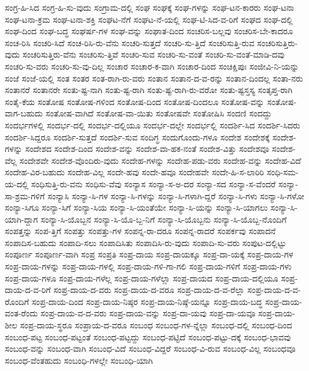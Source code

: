 {ಸಂಗ್ರ-ಹಿ-ಸಿದ
ಸಂಗ್ರ-ಹಿ-ಸು-ವುದು
ಸಂಗ್ರಾಮ-ದಲ್ಲಿ
ಸಂಘ
ಸಂಘಕ್ಕೆ
ಸಂಘ-ಗಳನ್ನು
ಸಂಘ-ಟನ-ಕಾರರು
ಸಂಘ-ಟನಾ
ಸಂಘ-ಟನಾ-ಕ್ರಮ
ಸಂಘ-ಟನಾ-ಶಕ್ತಿ
ಸಂಘಟ-ನೆಗೆ
ಸಂಘಟ-ನೆ-ಯಲ್ಲಿ
ಸಂಘ-ಟಿ-ಸಿದ-ವ-ರಿಗೆ
ಸಂಘದ
ಸಂಘ-ದಲ್ಲಿ
ಸಂಘ-ದಿಂದ
ಸಂಘ-ಬದ್ಧ
ಸಂಘರ್ಷ-ಗಳ
ಸಂಘ-ವನ್ನು
ಸಂಘಾತ-ದಿಂದ
ಸಂಚರಿಸ-ಬಲ್ಲವು
ಸಂಚರಿಸ-ಬೇ-ಕಾದರೂ
ಸಂಚ-ರಿಸಿ
ಸಂಚರಿ-ಸಿದೆ
ಸಂಚ-ರಿಸಿ-ರು-ವೆನು
ಸಂಚರಿ-ಸುತ್ತದೆ
ಸಂಚರಿ-ಸು-ತ್ತಿದೆ
ಸಂಚರಿಸುತ್ತಿ-ರುವ
ಸಂಚರಿಸುತ್ತಿರು-ವುದು
ಸಂಚರಿಸುತ್ತಿರು-ವೆನು
ಸಂಚರಿಸು-ತ್ತಿವೆ
ಸಂಚರಿ-ಸುವ
ಸಂಚರಿ-ಸು-ವಂತೆ
ಸಂಚರಿ-ಸು-ವಂತೆ-ಮಾಡಿ-ದವು
ಸಂಚರಿ-ಸು-ವರು
ಸಂಚರಿ-ಸು-ವು-ದಿಲ್ಲ
ಸಂಚಾರ
ಸಂಚಾರ-ಕ-ವಾಗಿ
ಸಂಚಾರ-ದಿಂದ
ಸಂಚಿಕ್ಷಿಪುಃ
ಸಂಜೀವಿ-ನಿ-ಯನ್ನು
ಸಂಜೆ
ಸಂಜೆ-ಯಲ್ಲಿ
ಸಂತ
ಸಂತರ
ಸಂತ-ರಾಗಿ-ರು-ವರು
ಸಂತಾನ
ಸಂತಾನ-ದ-ವ-ರನ್ನು
ಸಂತಾನ-ದಿಂದಲ್ಲ
ಸಂತಾ-ನರು
ಸಂತಾನರೆ
ಸಂತಾನರೇ
ಸಂತು-ಷ್ಟ-ನಾಗಿ
ಸಂತು-ಷ್ಟ-ರಾಗಿ
ಸಂತು-ಷ್ಟ-ರಾಗಿ-ರು-ವರೋ
ಸಂತು-ಷ್ಟಸ್ತಸ್ಯ
ಸಂತೃಪ್ತ-ರಾಗಿ
ಸಂತೈ-ಕೆಯ
ಸಂತೋಷ
ಸಂತೋಷ-ಗಳಿಂದ
ಸಂತೋಷ-ದಿಂದ
ಸಂತೋಷ-ದಿಂದಲೂ
ಸಂತೋಷ-ವನ್ನು
ಸಂತೋಷ-ವಾಗ-ಬಹುದು
ಸಂತೋಷ-ವಾಗಿದೆ
ಸಂತೋಷ-ವಾ-ಯಿತು
ಸಂತೋಷವೇ
ಸಂತೋಷಿಸಿ
ಸಂದಣಿ
ಸಂದದ್ದು
ಸಂದರ್ಭಗಳಲ್ಲಿ
ಸಂದರ್ಭ-ದಲ್ಲಿ
ಸಂದರ್ಭ-ದಲ್ಲಿಯೂ
ಸಂದರ್ಭ-ದಲ್ಲೇ
ಸಂದರ್ಭಲ್ಲಿ
ಸಂದರ್ಶಿ-ಸಿದ
ಸಂದರ್ಶಿ-ಸಿದರು
ಸಂದರ್ಶಿ-ಸಿದ್ದರೂ
ಸಂದರ್ಶಿ-ಸುತ್ತದೆ
ಸಂದರ್ಶಿ-ಸುವ
ಸಂದಿಗ್ಧ
ಸಂದುಗೊಂದು-ಗಳೂ
ಸಂದೇಶ
ಸಂದೇಶಕ್ಕೆ
ಸಂದೇಶ-ಗಳನ್ನು
ಸಂದೇಶದ
ಸಂದೇಶ-ದಿಂದ
ಸಂದೇಶ-ವನ್ನು
ಸಂದೇಶ-ವಾ-ಹಕ-ನಂತೆ
ಸಂದೇಶ-ವಿತ್ತು
ಸಂದೇಶವೂ
ಸಂದೇಶ-ವೆಲ್ಲ
ಸಂದೇಶವೇ
ಸಂದೇಶ-ವೊಂದಿರು-ವುದು
ಸಂದೇಹ-ಗಳನ್ನು
ಸಂದೇಹ-ಪಡು-ವರು
ಸಂದೇಹ-ವನ್ನು
ಸಂದೇಹ-ವಿದೆ
ಸಂದೇಹ-ವಿರ-ಬಹುದು
ಸಂದೇಹ-ವಿಲ್ಲ
ಸಂದೇ-ಹವು
ಸಂದೇ-ಹವೂ
ಸಂದೇಹವೇ
ಸಂದೇ-ಹಿ-ಸ-ಲಾರಿರಿ
ಸಂಧಿ-ಸಮ-ಯ-ದಲ್ಲಿ
ಸಂಧಿಸುತ್ತಿ-ರು-ವನು
ಸಂಧಿಸು-ವೆವು
ಸಂನ್ಯಾಸ
ಸಂನ್ಯಾ-ಸ-ಅ-ದರ
ಸಂನ್ಯಾ-ಸದ
ಸಂನ್ಯಾ-ಸ-ವೆಂದರೆ
ಸಂನ್ಯಾ-ಸಾ-ಶ್ರಮ-ಗಳಿಗೆ
ಸಂನ್ಯಾಸಿ
ಸಂನ್ಯಾ-ಸಿ-ಗಳ
ಸಂನ್ಯಾ-ಸಿ-ಗಳನ್ನು
ಸಂನ್ಯಾ-ಸಿ-ಗಳಾಗಿ-ದ್ದರೆ
ಸಂನ್ಯಾ-ಸಿ-ಗಳು
ಸಂನ್ಯಾ-ಸಿ-ಗಳೋ
ಸಂನ್ಯಾ-ಸಿಗೂ
ಸಂನ್ಯಾ-ಸಿಗೆ
ಸಂನ್ಯಾ-ಸಿಯ
ಸಂನ್ಯಾ-ಸಿ-ಯಂತೆಯೇ
ಸಂನ್ಯಾ-ಸಿ-ಯನ್ನು
ಸಂನ್ಯಾ-ಸಿ-ಯಾಗಲು
ಸಂನ್ಯಾ-ಸಿ-ಯಾಗಿ-ದ್ದಾಗ
ಸಂನ್ಯಾ-ಸಿ-ಯೊಬ್ಬನ
ಸಂನ್ಯಾ-ಸಿ-ಯೊ-ಬ್ಬ-ನಿಗೆ
ಸಂನ್ಯಾ-ಸಿ-ಯೊಬ್ಬನು
ಸಂನ್ಯಾ-ಸಿ-ಯೊಬ್ಬ-ನೊಂದಿಗೆ
ಸಂಪತ್ತನ್ನು
ಸಂಪ-ತ್ತಿಗೆ
ಸಂಪತ್ತು
ಸಂಪತ್ತು-ಗಳ
ಸಂಪನ್ನ-ರಾ-ದರೂ
ಸಂಪನ್ನ-ರಾದರೆ
ಸಂಪರ್ಕವು
ಸಂಪಾದನೆ
ಸಂಪಾದಿಸ-ಬಹುದು
ಸಂಪಾದಿ-ಸಲು
ಸಂಪಾದಿಸಿತು
ಸಂಪಾದಿಸಿ-ರು-ವುದು
ಸಂಪಾದಿ-ಸು-ವರು
ಸಂಪುಟ-ದಲ್ಲಿಟ್ಟು
ಸಂಪೂರ್ಣ
ಸಂಪೂರ್ಣ-ವಾಗಿ
ಸಂಪ್ರ
ಸಂಪ್ರತಿ
ಸಂಪ್ರ-ದಾಯ
ಸಂಪ್ರ-ದಾಯಕ್ಕೂ
ಸಂಪ್ರ-ದಾ-ಯಕ್ಕೆ
ಸಂಪ್ರ-ದಾಯ-ಗಳ
ಸಂಪ್ರ-ದಾಯ-ಗಳನ್ನು
ಸಂಪ್ರ-ದಾಯ-ಗಳಲ್ಲಿ
ಸಂಪ್ರ-ದಾಯ-ಗಳಿ-ಗಾ-ಗಲಿ
ಸಂಪ್ರ-ದಾಯ-ಗಳಿಗೆ
ಸಂಪ್ರ-ದಾಯ-ಗಳು
ಸಂಪ್ರ-ದಾಯ-ಗಳೂ
ಸಂಪ್ರ-ದಾಯ-ಗಳೆಲ್ಲ
ಸಂಪ್ರ-ದಾಯ-ಗಳೆಲ್ಲಾ
ಸಂಪ್ರ-ದಾಯದ
ಸಂಪ್ರ-ದಾಯ-ದಲ್ಲಿಯೂ
ಸಂಪ್ರ-ದಾಯ-ದ-ವ-ರಿಗೆ
ಸಂಪ್ರ-ದಾಯ-ದ-ವರು
ಸಂಪ್ರ-ದಾಯ-ದ-ವರೂ
ಸಂಪ್ರ-ದಾಯ-ದ-ವ-ರೆಲ್ಲಾ
ಸಂಪ್ರ-ದಾಯ-ದ-ವ-ರೊಂದಿಗೆ
ಸಂಪ್ರ-ದಾಯ-ದಿಂದ
ಸಂಪ್ರ-ದಾಯ-ನಿಷ್ಠರ
ಸಂಪ್ರ-ದಾಯ-ನಿಷ್ಠೆ-ಯನ್ನೂ
ಸಂಪ್ರ-ದಾಯ-ಬದ್ಧ
ಸಂಪ್ರ-ದಾಯ-ವಂತ-ರೆಂದು
ಸಂಪ್ರ-ದಾಯ-ವ-ದ-ವರು
ಸಂಪ್ರ-ದಾಯ-ವನ್ನು
ಸಂಪ್ರ-ದಾ-ಯವು
ಸಂಪ್ರ-ದಾ-ಯವೂ
ಸಂಪ್ರ-ದಾಯ-ಶೀಲ
ಸಂಪ್ರ-ದಾಯ-ಸ್ಥರೂ
ಸಂಪ್ರಾಯ-ದ-ವರೂ
ಸಂಬಂಧ
ಸಂಬಂಧ-ಗಳ-ನ್ನೆಲ್ಲಾ
ಸಂಬಂಧ-ದಲ್ಲಿ
ಸಂಬಂಧ-ದಿಂದ
ಸಂಬಂಧ-ಪಟ್ಟ
ಸಂಬಂಧ-ಪಟ್ಟಂತೆ
ಸಂಬಂಧ-ಪಟ್ಟದ್ದು
ಸಂಬಂಧ-ಪಟ್ಟಿದೆ
ಸಂಬಂಧ-ಪಟ್ಟು-ದಕ್ಕೆ
ಸಂಬಂಧ-ಭಾವವು
ಸಂಬಂಧ-ವನ್ನು
ಸಂಬಂಧ-ವಾಗಿ
ಸಂಬಂಧ-ವಿದೆ
ಸಂಬಂಧ-ವಿದ್ದರೆ
ಸಂಬಂಧ-ವಿ-ರುವ
ಸಂಬಂಧ-ವಿಲ್ಲ
ಸಂಬಂಧವೂ
ಸಂಬಂಧ-ವೆಂತಹುದು
ಸಂಬಂಧಿ-ಗಳಲ್ಲೇ
ಸಂಬಂಧಿ-ಯಾಗಿ
}
